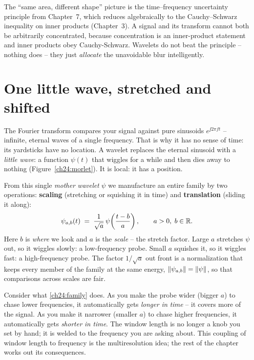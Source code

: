 \begin{connectionbox}
The ``same area, different shape'' picture is the time--frequency uncertainty
principle from Chapter~7, which reduces algebraically to the Cauchy--Schwarz
inequality on inner products (Chapter~3). A signal and its
transform cannot both be arbitrarily concentrated, because concentration is an
inner-product statement and inner products obey Cauchy-Schwarz. Wavelets do not
beat the principle -- nothing does -- they just \emph{allocate} the unavoidable
blur intelligently.
\end{connectionbox}

\section{One little wave, stretched and shifted}
\label{ch24:one-wave}

The Fourier transform compares your signal against pure sinusoids $e^{\jj 2\pi f
t}$ -- infinite, eternal waves of a single frequency. That is why it has no sense
of time: its yardsticks have no location. A wavelet replaces the eternal sinusoid
with a \emph{little wave}: a function $\psi(t)$ that wiggles for a while and then
dies away to nothing (Figure~\ref{ch24:morlet}). It is local: it has a position.

From this single \emph{mother wavelet} $\psi$ we manufacture an entire family by
two operations: \textbf{scaling} (stretching or squishing it in time) and
\textbf{translation} (sliding it along):
\begin{equation}
\label{ch24:family}
\psi_{a,b}(t) \;=\; \frac{1}{\sqrt{a}}\,
\psi\!\left(\frac{t-b}{a}\right),
\qquad a > 0,\; b \in \mathbb{R}.
\end{equation}
Here $b$ is \emph{where} we look and $a$ is the \emph{scale} -- the stretch
factor. Large $a$ stretches $\psi$ out, so it wiggles slowly: a low-frequency
probe. Small $a$ squishes it, so it wiggles fast: a high-frequency probe. The
factor $1/\sqrt{a}$ out front is a normalization that keeps every member of the
family at the same energy, $\lVert\psi_{a,b}\rVert = \lVert\psi\rVert$, so that comparisons
across scales are fair.

\begin{happeningbox}
Consider what \eqref{ch24:family} does. As you make the probe wider (bigger
$a$) to chase lower frequencies, it automatically gets \emph{longer in time} --
it covers more of the signal. As you make it narrower (smaller $a$) to chase
higher frequencies, it automatically gets \emph{shorter in time}. The window
length is no longer a knob you set by hand; it is welded to the frequency you are
asking about. This coupling of window length to frequency is the multiresolution
idea; the rest of the chapter works out its consequences.
\end{happeningbox}

